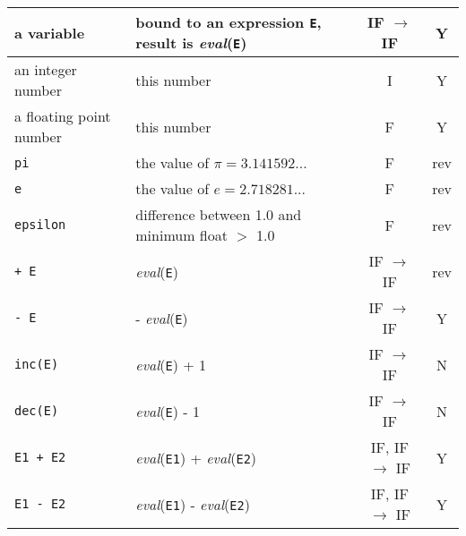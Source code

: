 \begin{supertabular}{|l|L{7.5cm}|c|c|}
a variable & bound to an expression \texttt{E}, result is \textit{eval}(\texttt{E}) & IF $\rightarrow$ IF & Y \\

\hline

an integer number & this number & I & Y \\

\hline

a floating point number & this number & F & Y \\

\hline

\texttt{pi} & the value of $\pi = 3.141592...$ & F & rev \\

\hline

\texttt{e} & the value of $e = 2.718281...$ & F & rev \\

\hline

\texttt{epsilon} & difference between 1.0 and minimum float $>$ 1.0 & F & rev \\

\hline

\texttt{+ E} & \textit{eval}(\texttt{E}) & IF $\rightarrow$ IF & rev \\

\hline

\texttt{- E} & - \textit{eval}(\texttt{E}) & IF $\rightarrow$ IF & Y \\

\hline

\texttt{inc(E)} & \textit{eval}(\texttt{E}) + 1 & IF $\rightarrow$ IF & N \\

\hline

\texttt{dec(E)} & \textit{eval}(\texttt{E}) - 1 & IF $\rightarrow$ IF & N \\

\hline

\texttt{E1 + E2} & \textit{eval}(\texttt{E1}) + \textit{eval}(\texttt{E2}) &
IF, IF $\rightarrow$ IF & Y \\

\hline

\texttt{E1 - E2} & \textit{eval}(\texttt{E1}) - \textit{eval}(\texttt{E2}) &
IF, IF $\rightarrow$ IF & Y \\


\end{supertabular}
